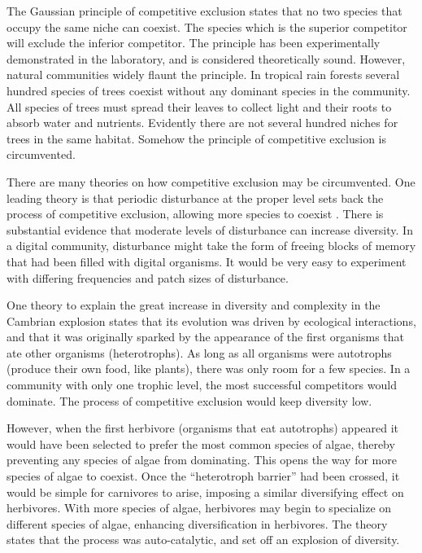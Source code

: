 The Gaussian principle of competitive exclusion states that no two species
that occupy the same niche can coexist.  The species which is the superior
competitor will exclude the inferior competitor.  The principle has been
experimentally demonstrated in the laboratory, and is considered
theoretically sound.  However, natural communities widely flaunt the
principle.  In tropical rain forests several hundred species of trees
coexist without any dominant species in the community.  All species of
trees must spread their leaves to collect light and their roots to absorb
water and nutrients.  Evidently there are not several hundred niches for
trees in the same habitat.  Somehow the principle of competitive exclusion
is circumvented.

There are many theories on how competitive exclusion may be circumvented.
One leading theory is that periodic disturbance at the proper level
sets back the process of competitive exclusion, allowing more species
to coexist \cite{Hust79,Hust92,Hust93}.  There is
substantial evidence that moderate levels of disturbance can increase
diversity.  In a digital community, disturbance might take the form of
freeing blocks of memory that had been filled with digital organisms.
It would be very easy to experiment with differing frequencies and patch
sizes of disturbance.

One theory to explain the great increase in diversity and complexity in
the Cambrian explosion \cite{Stan} states that its evolution was driven
by ecological interactions, and that it was originally
sparked by the appearance of the first organisms that ate other
organisms (heterotrophs).  As long as all organisms were autotrophs
(produce their own food, like plants), there was only room for a few
species.  In a community with only one trophic level, the most successful
competitors would dominate.  The process of competitive exclusion would
keep diversity low.

However, when the first herbivore (organisms that eat autotrophs)
appeared it would have been selected to prefer the most common species
of algae, thereby preventing any species of algae from dominating.
This opens the way for more species of algae to coexist.  Once the
``heterotroph barrier'' had been crossed, it would be simple for
carnivores to arise, imposing a similar diversifying effect on
herbivores.  With more species of algae, herbivores may begin to
specialize on different species of algae, enhancing diversification
in herbivores.  The theory states that the process was
auto-catalytic, and set off an explosion of diversity.

